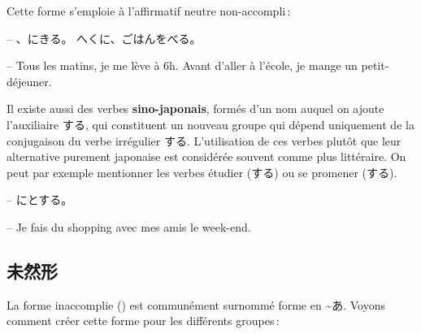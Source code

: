 Cette forme s'emploie à l'affirmatif neutre non-accompli :

\begin{tcolorbox}
    -- 、にきる。 へくに、ごはんをべる。

    -- Tous les matins, je me lève à 6h. Avant d'aller à l'école, je mange un petit-déjeuner.
\end{tcolorbox}

Il existe aussi des verbes \textbf{sino-japonais}, formés d'un nom auquel on ajoute l'auxiliaire する, qui constituent un nouveau groupe qui dépend uniquement de la conjugaison du verbe irrégulier する. L'utilisation de ces verbes plutôt que leur alternative purement japonaise est considérée souvent comme plus littéraire. On peut par exemple mentionner les verbes étudier (する) ou se promener (する).

\begin{tcolorbox}
    -- にとする。

    -- Je fais du shopping avec mes amis le week-end.
\end{tcolorbox}

\subsection{未然形}

La forme inaccomplie () est communément surnommé forme en \~{}あ. Voyons comment créer cette forme pour les différents groupes :


